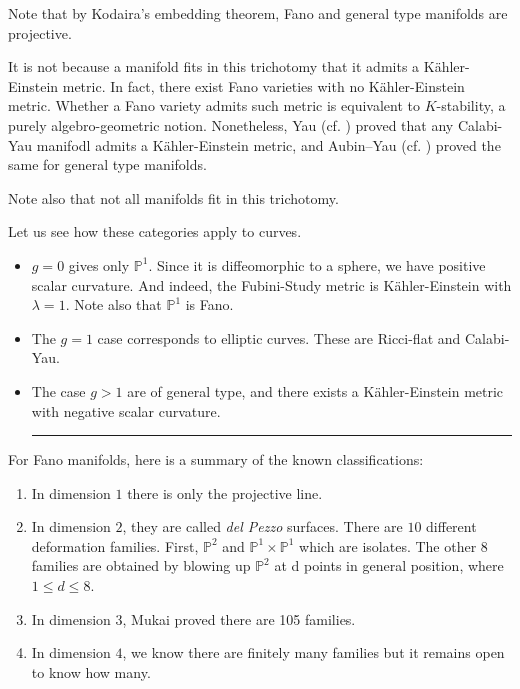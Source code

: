 \documentclass[11pt]{amsart}
\newcommand{\bP}{\mathbb{P}}
\newif\ifqedbarused
\newcommand{\qedbar}{%
  \unskip\nobreak\hfill %
  \hspace{1em} %
  \rule{3em}{0.4pt} %
}
\newcommand{\qedbarhere}{%
  \qedbar%
  \global\qedbarusedtrue%
}
\theoremstyle{definition}
\numberwithin{equation}{section}
\begin{document}
Note that by Kodaira's embedding theorem, Fano and general type manifolds are projective.
\begin{caution}
	It is not because a manifold fits in this trichotomy that it admits a Kähler-Einstein metric. In fact, there exist Fano varieties with no Kähler-Einstein metric. Whether a Fano variety admits such metric is equivalent to $K$-stability, a purely algebro-geometric notion. Nonetheless, Yau (cf. \cite{Yau1978}) proved that any Calabi-Yau manifodl admits a Kähler-Einstein metric, and Aubin--Yau (cf. \cite{Aubin76,Yau1978}) proved the same for general type manifolds.
	
	Note also that not all manifolds fit in this trichotomy. 
\end{caution}
\begin{example}[Curves]
Let us see how these categories apply to curves.
\begin{itemize}
	\item $g=0$ gives only $\bP^1$. Since it is diffeomorphic to a sphere, we have positive scalar curvature. And indeed, the Fubini-Study metric is Kähler-Einstein with $\lambda=1$. Note also that $\bP^1$ is Fano.
	\item The $g=1$ case corresponds to elliptic curves. These are Ricci-flat and Calabi-Yau.
	\item The case $g>1$ are of general type, and there exists a Kähler-Einstein metric with negative scalar curvature.\qedbarhere
\end{itemize}
\end{example}
For Fano manifolds, here is a summary of the known classifications:
\begin{enumerate}
	\item In dimension $1$ there is only the projective line.
	\item In dimension $2$, they are called \emph{del Pezzo} surfaces. There are $10$ different deformation families. First, $\bP^2$ and $\bP^1\times\bP^1$ which are isolates. The other $8$ families are obtained by blowing up $\bP^2$ at d points in general position, where $1\leq d\leq 8$.
	\item In dimension $3$, Mukai proved there are 105 families.
	\item In dimension $4$, we know there are finitely many families but it remains open to know how many.
\end{enumerate}
\end{document}
